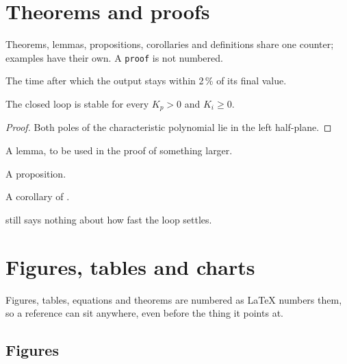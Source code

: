 \section{Theorems and proofs}
\label{sec:theorems}

Theorems, lemmas, propositions, corollaries and definitions share one counter; examples have their own. A \texttt{proof} is not numbered.

\begin{definition}
The time after which the output stays within 2\,\% of its final value.
\end{definition}

\begin{theorem}[Stability]
\label{thm:stable}
The closed loop is stable for every $K_p > 0$ and $K_i \ge 0$.
\end{theorem}

\begin{proof}
Both poles of the characteristic polynomial lie in the left half-plane.
\end{proof}

\begin{lemma}
A lemma, to be used in the proof of something larger.
\end{lemma}

\begin{proposition}
A proposition.
\end{proposition}

\begin{corollary}
A corollary of .
\end{corollary}

\begin{example}
 still says nothing about how fast the loop settles.
\end{example}

\clearpage

\section{Figures, tables and charts}
\label{sec:figures}

Figures, tables, equations and theorems are numbered as LaTeX numbers them, so a reference can sit anywhere, even before the thing it points at.

\subsection{Figures}

